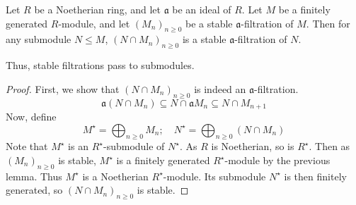 \begin{proposition}
    Let \( R \) be a Noetherian ring, and let \( \mathfrak a \) be an ideal of \( R \).
    Let \( M \) be a finitely generated \( R \)-module, and let \( (M_n)_{n \geq 0} \) be a stable \( \mathfrak a \)-filtration of \( M \).
    Then for any submodule \( N \leq M \), \( (N \cap M_n)_{n \geq 0} \) is a stable \( \mathfrak a \)-filtration of \( N \).
\end{proposition}
Thus, stable filtrations pass to submodules.
\begin{proof}
    First, we show that \( (N \cap M_n)_{n \geq 0} \) is indeed an \( \mathfrak a \)-filtration.
    \[ \mathfrak a(N \cap M_n) \subseteq N \cap \mathfrak a M_n \subseteq N \cap M_{n + 1} \]
    Now, define
    \[ M^\star = \bigoplus_{n \geq 0} M_n;\quad N^\star = \bigoplus_{n \geq 0} (N \cap M_n) \]
    Note that \( M^\star \) is an \( R^\star \)-submodule of \( N^\star \).
    As \( R \) is Noetherian, so is \( R^\star \).
    Then as \( (M_n)_{n \geq 0} \) is stable, \( M^\star \) is a finitely generated \( R^\star \)-module by the previous lemma.
    Thus \( M^\star \) is a Noetherian \( R^\star \)-module.
    Its submodule \( N^\star \) is then finitely generated, so \( (N \cap M_n)_{n \geq 0} \) is stable.
\end{proof}
